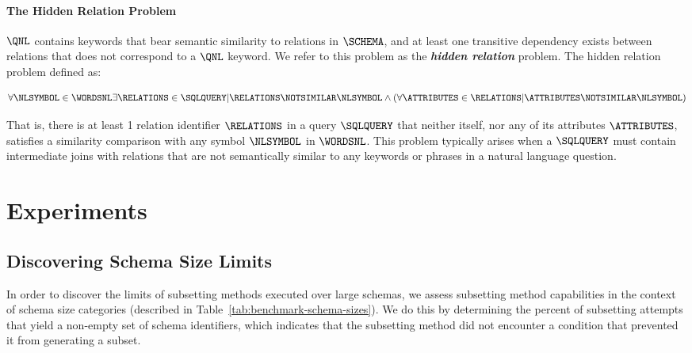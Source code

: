 \paragraph{\textbf{The Hidden Relation Problem}}

$\QNL$ contains keywords that bear semantic similarity to relations in $\SCHEMA$, and at least one transitive dependency exists between relations that does not correspond to a $\QNL$ keyword.
We refer to this problem as the \textbf{\emph{hidden relation}} problem.
The hidden relation problem defined as:

\begin{equation}
   \forall \NLSYMBOL \in \WORDSNL \exists \RELATIONS \in \SQLQUERY | \RELATIONS \NOTSIMILAR \NLSYMBOL \land (\forall \ATTRIBUTES \in \RELATIONS| \ATTRIBUTES \NOTSIMILAR \NLSYMBOL)
\end{equation}

That is, there is at least 1 relation identifier $\RELATIONS$ in a query $\SQLQUERY$ that neither itself, nor any of its attributes $\ATTRIBUTES$, satisfies a similarity comparison with any symbol $\NLSYMBOL$ in $\WORDSNL$.
This problem typically arises when a $\SQLQUERY$ must contain intermediate joins with relations that are not semantically similar to any keywords or phrases in a natural language question.



\section{Experiments}



\subsection{Discovering Schema Size Limits}
In order to discover the limits of subsetting methods executed over large schemas, we assess subsetting method capabilities in the context of schema size categories (described in Table~\ref{tab:benchmark-schema-sizes}).
We do this by determining the percent of subsetting attempts that yield a non-empty set of schema identifiers, which indicates that the subsetting method did not encounter a condition that prevented it from generating a subset.

